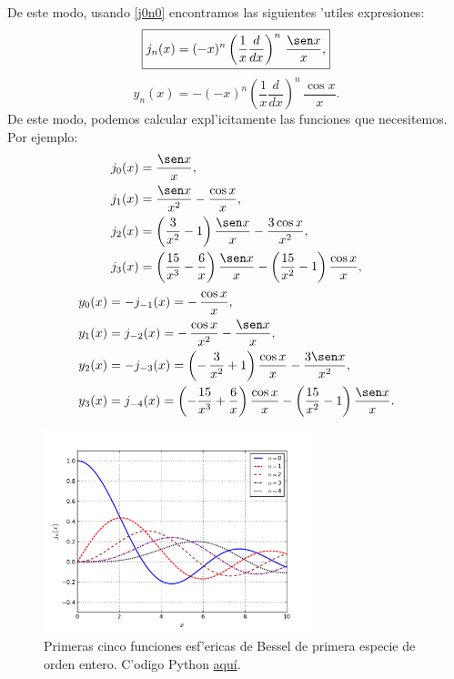De este modo, usando \eqref{j0n0} encontramos las siguientes 'utiles expresiones:
\begin{equation}
\boxed{j_n(x) = (-x)^n \left(\frac{1}{x}\frac{d}{dx}\right)^n\,\frac{\sen x}{x},}
\end{equation}
\begin{equation}
\boxed{y_n(x) = -(-x)^n \left(\frac{1}{x}\frac{d}{dx}\right)^n\,\frac{\cos x}{x}.}
\end{equation}
De este modo, podemos calcular expl'icitamente las funciones que necesitemos. Por ejemplo:
\begin{align}
j_0(x) &= \frac{\sen x}{x}, \\
j_1(x) &= \frac{\sen x} {x^2}- \frac{\cos x} {x}, \\
j_2(x) &= \left(\frac{3} {x^2} - 1 \right)\frac{\sen x}{x} - \frac{3\cos x} {x^2}, \\
j_3(x) &= \left(\frac{15}{x^3} - \frac{6}{x} \right)\frac{\sen x}{x} -\left(\frac{15}{x^2} - 1\right) \frac{\cos x} {x},
\end{align}
\begin{align}
y_0(x) &= -j_{-1}(x)=-\,\frac{\cos x} {x} ,\\
y_1(x) &= j_{-2}(x)=-\,\frac{\cos x} {x^2}- \frac{\sen x} {x}, \\
y_2(x) &=-j_{-3}(x)=\left(-\,\frac{3}{x^2}+1 \right)\frac{\cos x}{x}- \frac{3 \sen x} {x^2}, \\
y_{3}(x) &= j_{-4}(x) =\left( -\frac{15}{x^{3}}+\frac{6}{x}\right) \frac{\cos
x}{x}-\left( \frac{15}{x^{2}}-1\right) \frac{\sen x}{x}.
\end{align}
\begin{figure}[H]
\centering
\includegraphics[angle=0,width=0.7\textwidth]{figs/fig-Bessel-Esferica-j.pdf}
\caption{Primeras cinco funciones esf'ericas de Bessel de primera especie de orden entero. C'odigo Python \href{https://github.com/gfrubi/FM2/blob/master/figuras-editables/fig-Bessel.py}{aqu\'i}.}
\label{fig-jn}
\end{figure}
